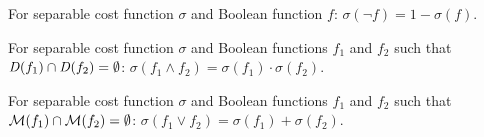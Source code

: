 \documentclass{llncs}
\newcommand{\interpset}[1]{{\cal M}(#1)}
\newcommand{\cost}{\sigma}
\newcommand{\depend}{{\it D}}
\begin{document}
\begin{lemma}[Complementation]
  For separable cost function $\cost$ and Boolean function $f$:
  $\cost(\neg f) = 1 - \cost(f)$.
\end{lemma}

\begin{lemma}
  For separable cost function $\cost$ and Boolean functions $f_1$ and $f_2$ such that $\depend(f_1) \cap \depend(f_2) = \emptyset$:
    $\cost(f_1 \land f_2) = \cost(f_1) \cdot \cost(f_2)$.
\end{lemma}

\begin{lemma}
  For separable cost function $\cost$ and Boolean functions $f_1$ and $f_2$ such that $\interpset{f_1} \cap \interpset{f_2} = \emptyset$:
    $\cost(f_1 \lor f_2) = \cost(f_1) + \cost(f_2)$.
\end{lemma}


\end{document}
